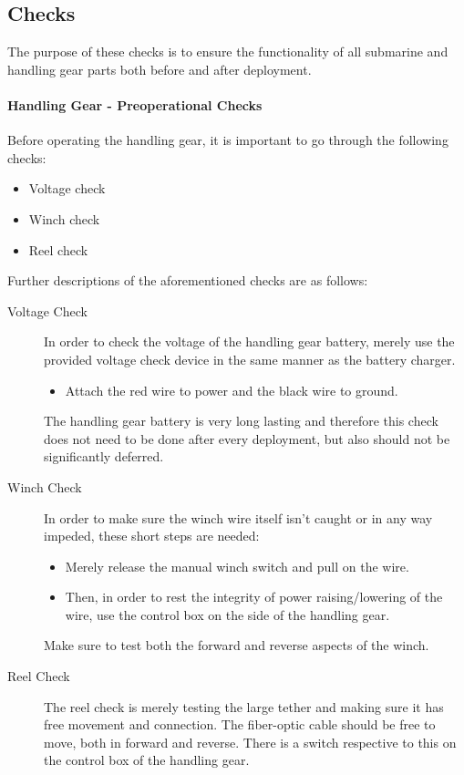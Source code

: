 \documentclass[
18pt, %
a4paper, %
oneside, %
headinclude,footinclude, %
]{scrartcl}
\begin{document}
\subsection{Checks}

The purpose of these checks is to ensure the functionality of all submarine and handling gear parts both before and after deployment.

\paragraph{Handling Gear - Preoperational Checks} Before operating the handling gear, it is important to go through the following checks:

\begin{itemize}[noitemsep] %
	\item Voltage check
	\item Winch check
	\item Reel check
	
\end{itemize}
Further descriptions of the aforementioned checks are as follows:

\begin{description}
	\item[Voltage Check] In order to check the voltage of the handling gear battery, merely use the provided voltage check device in the same manner as the battery charger.
	\begin{itemize}
		\item Attach the red wire to power and the black wire to ground.
	\end{itemize}  The handling gear battery is very long lasting and therefore this check does not need to be done after every deployment, but also should not be significantly deferred.
	\item[Winch Check] In order to make sure the winch wire itself isn't caught or in any way impeded, these short steps are needed:
	\begin{itemize}
		\item Merely release the manual winch switch and pull on the wire.
		\item Then, in order to rest the integrity of power raising/lowering of the wire, use the control box on the side of the handling gear.	
	\end{itemize}   Make sure to test both the forward and reverse aspects of the winch. 
	\item[Reel Check] The reel check is merely testing the large tether and making sure it has free movement and connection. The fiber-optic cable should be free to move, both in forward and reverse. There is a switch respective to this on the control box of the handling gear.
\end{description}
\end{document}
